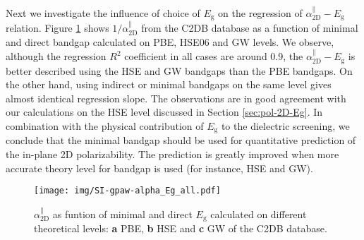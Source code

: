 \documentclass[manuscript=suppinfo,email=true,hyperref=true,keywords=false]{achemso}
\begin{document}
Next we investigate the influence of choice of $E_{\mathrm{g}}$ on the
regression of $\alpha_{\mathrm{2D}}^{\parallel}-E_{\mathrm{g}}$ relation. Figure
\ref{fig:SI-gpaw-alpha-Eg-all} shows $1/\alpha_{\mathrm{2D}}^{\parallel}$ from the
C2DB database as a function of minimal and direct bandgap calculated
on PBE, HSE06 and GW levels. We observe,
although the regression $R^{2}$ coefficient in all cases are around
0.9, the $\alpha_{\mathrm{2D}}^{\parallel}-E_{\mathrm{g}}$ is better described using
the HSE and GW bandgaps than the PBE bandgaps. On the other hand,
using indirect or minimal bandgaps on the same level gives almost
identical regression slope. The observations are in good agreement
with our calculations on the HSE level discussed in Section
\ref{sec:pol-2D-Eg}. In combination with the physical contribution of
$E_{\mathrm{g}}$ to the dielectric screening, we conclude that the
minimal bandgap should be used for quantitative prediction of the
in-plane 2D polarizability. The prediction is greatly improved when
more accurate theory level for bandgap is used (for instance, HSE and GW).

\begin{figure}[htbp]
  \centering
  \texttt{[image: img/SI-gpaw-alpha\_Eg\_all.pdf]}
  \caption{$\alpha_{\mathrm{2D}}^{\parallel}$ as funtion of minimal and direct
    $E_{\mathrm{g}}$ calculated on different theoretical levels:
    \textbf{a} PBE, \textbf{b} HSE and \textbf{c} GW of the C2DB
    database.}
  \label{fig:SI-gpaw-alpha-Eg-all}
\end{figure}
\end{document}

